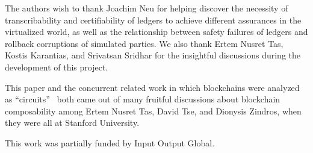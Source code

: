 \appsection[Acknowledgements]

The authors wish to thank Joachim Neu for helping discover
the necessity of transcribability and certifiability of ledgers to achieve
different assurances in the virtualized world,
as well as the relationship between safety failures of ledgers
and rollback corruptions of simulated parties.
We also thank Ertem Nusret Tas, Kostis Karantias, and
Srivatsan Sridhar for the insightful discussions during the development of this
project.

This paper and the concurrent related work in which blockchains were analyzed
as ``circuits''~\cite{circuits} both came out of many fruitful discussions about
blockchain composability among Ertem Nusret Tas, David Tse, and Dionysis Zindros, when
they were all at Stanford University.

This work was partially funded by Input Output Global.